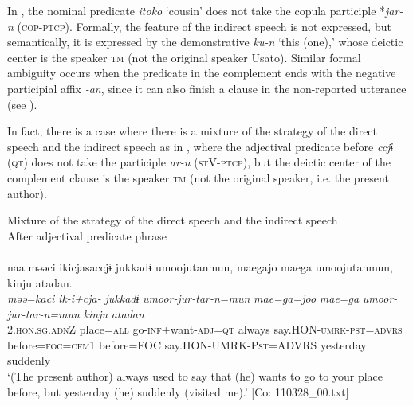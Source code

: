 In , the nominal predicate \textit{itoko} ‘cousin’ does not take the copula participle *\textit{jar-n} (\textsc{cop}-\textsc{ptcp}). Formally, the feature of the indirect speech is not expressed, but semantically, it is expressed by the demonstrative \textit{ku-n} ‘this (one),’ whose deictic center is the speaker \textsc{tm} (not the original speaker Usato). Similar formal ambiguity occurs when the predicate in the complement ends with the negative participial affix \textit{{}-an}, since it can also finish a clause in the non-reported utterance (see ).

  In fact, there is a case where there is a mixture of the strategy of the direct speech and the indirect speech as in , where the adjectival predicate before \textit{ccjɨ} (\textsc{qt}) does not take the participle \textit{ar-n} (\textsc{st}V-\textsc{ptcp}), but the deictic center of the complement clause is the speaker \textsc{tm} (not the original speaker, i.e. the present author).

\ea\label{ex:10.65}   Mixture of the strategy of the direct speech and the indirect speech\\
  After adjectival predicate phrase\\\\
      \glll    naa  məəci  ikicjasaccjɨ  jukkadɨ  umoojutanmun,  {\textbar}mae{\textbar}gajo  {\textbar}mae{\textbar}ga  umoojutanmun,  kinju  atadan.\\                                                                                                                                                     
    \textit{}  \textit{məə=kaci}  \textit{ik-i+cja-}  \textit{jukkadɨ}  \textit{umoor-jur-tar-n=mun}  \textit{mae=ga=joo}  \textit{mae=ga} \textit{umoor-jur-tar-n=mun}  \textit{kinju}  \textit{atadan}\\                                                                                                                                                     
    2.\textsc{hon}.\textsc{sg}.\textsc{adn}Z  place=\textsc{all}  go-\textsc{inf}+want-\textsc{adj}=\textsc{qt}  always   say.HON-\textsc{umrk}-\textsc{pst}=\textsc{advrs}  before=\textsc{foc}=\textsc{cfm}1  before=FOC   say.HON-UMRK-P\textsc{st}=ADVRS  yesterday  suddenly\\
    \glt ‘(The present author) always used to say that (he) wants to go to your place before, but yesterday (he) suddenly (visited me).’ [Co: 110328\_00.txt]
\z

